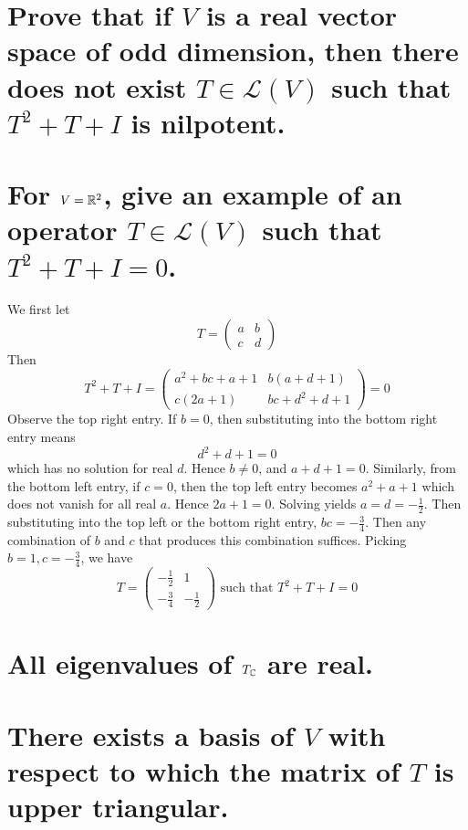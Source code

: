 \documentclass[answers]{exam}
\begin{document}
\begin{questions}
\begin{parts}
\end{parts}


\begin{parts}
    \part{Prove that if $V$ is a real vector space of odd dimension, then there does not exist $T \in \mathcal L(V)$ such that $T^2+T+I$ is nilpotent.}

    \part{For $V=\mathbb{R}^2$, give an example of an operator $T \in \mathcal L(V)$ such that $T^2+T+I=0$.}

    \begin{solution}
        We first let
        $$T = \begin{pmatrix} a & b \\ c & d \end{pmatrix}$$
        Then
        $$T^2 + T + I = \begin{pmatrix} a^2+bc+a+1 & b(a+d+1) \\ c(2a+1) & bc+d^2+d+1 \end{pmatrix} = 0$$
        Observe the top right entry. If $b=0$, then substituting into the bottom right entry means
        $$d^2+d+1=0$$
        which has no solution for real $d$. Hence $b\neq 0$, and $a+d+1=0$. Similarly, from the bottom left entry, if $c=0$, then the top left entry becomes $a^2+a+1$ which does not vanish for all real $a$. Hence $2a+1=0$. Solving yields $a=d=-\frac{1}{2}$. Then substituting into the top left or the bottom right entry, $bc=-\frac{3}{4}$. Then any combination of $b$ and $c$ that produces this combination suffices. Picking $b=1,c=-\frac{3}{4}$, we have
        $$T = \begin{pmatrix} -\frac{1}{2} & 1 \\ -\frac{3}{4} & -\frac{1}{2} \end{pmatrix} \text{ such that } T^2 + T + I = 0$$
    \end{solution}

\end{parts}


\begin{parts}
    \part{All eigenvalues of $T_{\mathbb{C}}$ are real.}
    \part{There exists a basis of $V$ with respect to which the matrix of $T$ is upper triangular.}
\end{parts}


\end{questions}
\end{document}
